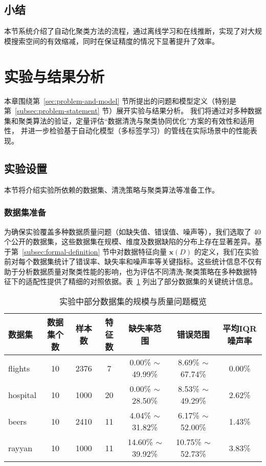 \documentclass[10pt]{article} %
\numberwithin{equation}{section}
\begin{document}
\subsection{小结}
本节系统介绍了自动化聚类方法的流程，通过离线学习和在线推断，实现了对大规模搜索空间的有效缩减，同时在保证精度的情况下显著提升了效率。


\section{实验与结果分析}
\label{sec:chapter5}

本章围绕第~\ref{sec:problem-and-model} 节所提出的问题和模型定义（特别是第~\ref{subsec:problem-statement} 节）展开实验与结果分析。
我们将通过对多种数据集和聚类算法的验证，定量评估“数据清洗与聚类协同优化”方案的有效性和适用性，
并进一步检验基于自动化模型（多标签学习）的管线在实际场景中的性能表现。

\subsection{实验设置}
\label{sec:exp_setting}

本节将介绍实验所依赖的数据集、清洗策略与聚类算法等准备工作。

\subsubsection{数据集准备}
\label{sec:dataset_prep}

为确保实验覆盖多种数据质量问题（如缺失值、错误值、噪声等），我们选取了 40 个公开的数据集，这些数据集在规模、维度及数据缺陷的分布上存在显著差异。基于第~\ref{subsec:formal-definition} 节中对数据特征向量 $\mathbf{x}(D)$ 的定义，我们在实验前对每个数据集统计了错误率、缺失率和噪声率等关键指标。这些统计信息不仅有助于分析数据质量对聚类性能的影响，也为评估不同清洗-聚类策略在多种数据特征下的适配性提供了精细的对照依据。表~\ref{tab:datasets_info} 列出了部分数据集的关键统计信息。

\begin{table}[htbp]
    \centering
    \small %
    \begin{tabular}{lcccccc}
    \toprule
    \textbf{数据集} & \textbf{数据集个数} & \textbf{样本数} & \textbf{特征数} & \textbf{缺失率范围} & \textbf{错误范围} & \textbf{平均IQR噪声率} \\
    \midrule
    flights  & 10  & 2376   & 7  & 0.00\% $\sim$ 49.99\% & 8.69\% $\sim$ 67.74\%  & 0.00\%  \\
    hospital & 10  & 1000   & 20 & 0.00\% $\sim$ 28.50\% & 8.53\% $\sim$ 49.29\%  & 2.62\%  \\
    beers    & 10  & 2410   & 11 & 4.04\% $\sim$ 31.82\% & 6.17\% $\sim$ 52.00\%  & 1.43\%  \\
    rayyan   & 10  & 1000   & 11 & 14.60\% $\sim$ 39.92\% & 10.75\% $\sim$ 52.73\% & 3.83\%  \\
    \bottomrule
    \end{tabular}
    \caption{实验中部分数据集的规模与质量问题概览}
    \label{tab:datasets_info}
\end{table}
\end{document}
